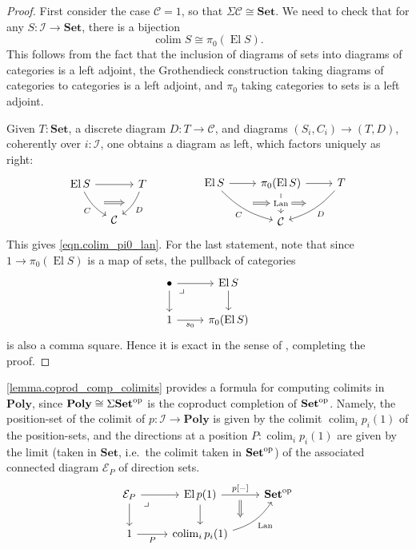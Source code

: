 \documentclass[11pt, one side, article]{memoir}
\theoremstyle{definition}
\theoremstyle{plain}
\DeclareMathOperator*{\colim}{colim}
\DeclareMathOperator{\el}{El}
\newcommand{\cat}[1]{\mathcal{#1}}%
\newcommand{\Cat}[1]{\mathbf{#1}}%
\newcommand{\fun}[1]{\mathrm{#1}}%
\newcommand{\op}{^\tn{op}}
\newcommand{\tn}[1]{\textnormal{#1}}
\newcommand{\smset}{\Cat{Set}}
\newcommand{\poly}{\Cat{Poly}}
\begin{document}
\begin{proof}
First consider the case $\cat{C}=1$, so that $\Sigma\cat{C}\cong\smset$. We need to check that for any $S\colon\cat{I}\to\smset$, there is a bijection
\begin{equation}\label{eqn.colim_pi0}
\colim S\cong\pi_0(\el S).
\end{equation}
This follows from the fact that the inclusion of diagrams of sets into diagrams of categories is a left adjoint, the Grothendieck construction taking diagrams of categories to categories is a left adjoint, and $\pi_0$ taking categories to sets is a left adjoint.

Given $T:\smset$, a discrete diagram $D\colon T\to\cat{C}$, and diagrams
$(S_i,C_i)\to(T,D)$, coherently over $i:\cat{I}$, one obtains a diagram as left, which factors uniquely as right:
\[
\begin{tikzcd}[column sep=10pt]
	\el S\ar[rr]\ar[dr, bend right=15pt, "C"', "" name=C]&&
	T\ar[dl, bend left=15pt, "D", ""' name=D]\\&
	\cat{C}
	\ar[from=C, to=C-|D, shorten=5pt, Rightarrow]
\end{tikzcd}
\hspace{.6in}
\begin{tikzcd}
	\el S\ar[r]\ar[dr, bend right=15pt, "C"', "" name=C]&
	\pi_0(\el S)\ar[d, "\fun{Lan}" description, "" name=L, ""' name=L']\ar[r]&
	T\ar[dl, bend left=15pt, "D", ""' name=D]\\&
	\cat{C}
	\ar[from=C|-L', to=L', shorten=5pt, Rightarrow]
	\ar[from=L, to=L-|D, shorten=5pt, Rightarrow]
\end{tikzcd}
\]
This gives \eqref{eqn.colim_pi0_lan}. For the last statement, note that since $1\to\pi_0(\el S)$ is a map of sets, the pullback of categories
\[
\begin{tikzcd}
  \bullet\ar[r]\ar[d]\ar[dr, phantom, very near start, "\lrcorner"]&
  \el S\ar[d]\\
  1\ar[r, "s_0"']&
  \pi_0(\el S)
\end{tikzcd}
\]
is also a comma square. Hence it is exact in the sense of \cite{nlab:exact_square}, completing the proof.
\end{proof}

\cref{lemma.coprod_comp_colimits} provides a formula for computing colimits in $\poly$, since $\poly\cong\Sigma\smset\op$ is the coproduct completion of $\smset\op$. Namely, the position-set of the colimit of $p\colon\cat{I}\to\poly$ is given by the colimit $\colim_ip_i(1)$ of the position-sets, and the directions at a position $P:\colim_ip_i(1)$ are given by the limit (taken in $\smset$, i.e.\ the colimit taken in $\smset\op$) of the associated connected diagram $\cat{E}_P$ of direction sets.
\[
\begin{tikzcd}
	\cat{E}_P\ar[r]\ar[d]&
	\el p(1)\ar[r, "{p[-]}", ""' name=C]\ar[d]&
	\smset\op\\
	1\ar[r, "P"']&
	\colim_ip_i(1)\ar[ur, bend right=20pt, "\fun{Lan}"', "" name=colim]
	\ar[from=C, to=C|-colim, Rightarrow]\ar[ul, phantom, very near end, "\lrcorner"]
\end{tikzcd}
\]
\end{document}
